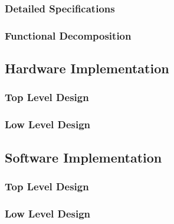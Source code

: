 \documentclass[12pt]{article} %
\begin{document}
\subsubsection{Detailed Specifications\label{detailedSpec}} %

\subsubsection{Functional Decomposition\label{functions}} %

\subsection{Hardware Implementation\label{hwImplementation}} 

\subsubsection{Top Level Design\label{hwTopLevel}} %

\subsubsection{Low Level Design\label{hwLowLevel}} %

\subsection{Software Implementation\label{swImplementation}}
%
%

\subsubsection{Top Level Design\label{swTopLevel}} %
%

\subsubsection{Low Level Design\label{swLowLevel}} %
%
\end{document}

